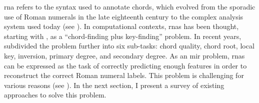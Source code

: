 

\gls{rna} refers to the syntax used to annotate chords,
which evolved from the sporadic use of Roman numerals in the
late eighteenth century to the complex analysis system used
today (see ). In
computational contexts, \glspl{rna} has been thought,
starting with \textcite{temperley1997algorithm}, as a
``chord-finding plus key-finding'' problem. In recent years,
\textcite{chen2018functional} subdivided the problem further
into six sub-tasks: chord quality, chord root, local key,
inversion, primary degree, and secondary degree. As an
\gls{mir} problem, \glspl{rna} can be expressed as the task
of correctly predicting enough features in order to
reconstruct the correct Roman numeral labels. This problem
is challenging for various reasons (see
). In the next section, I present a
survey of existing approaches to solve this problem.
